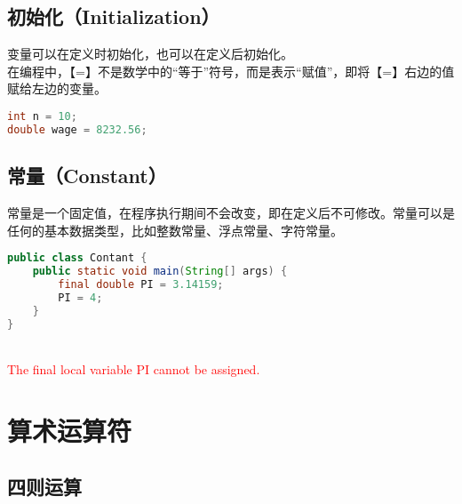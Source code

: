 \subsection{初始化（Initialization）}

变量可以在定义时初始化，也可以在定义后初始化。 \\

在编程中，【=】不是数学中的“等于”符号，而是表示“赋值”，即将【=】右边的值赋给左边的变量。

\vspace{-0.5cm}

\begin{lstlisting}[language=Java]
int n = 10;
double wage = 8232.56;
\end{lstlisting}

\subsection{常量（Constant）}

常量是一个固定值，在程序执行期间不会改变，即在定义后不可修改。常量可以是任何的基本数据类型，比如整数常量、浮点常量、字符常量。 \\


\begin{lstlisting}[language=Java]
public class Contant {
    public static void main(String[] args) {
        final double PI = 3.14159;
        PI = 4;
    }
}
\end{lstlisting}

\begin{tcolorbox}
	 \\
	\textcolor{red}{The final local variable PI cannot be assigned.}
\end{tcolorbox}

\section{算术运算符}

\subsection{四则运算}

\begin{table}[H]
	\centering
	\caption{四则运算}
\end{table}

